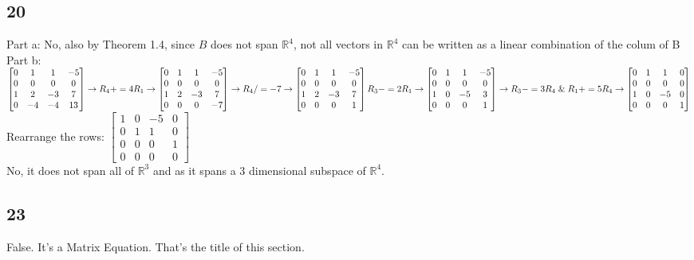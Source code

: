 \documentclass{article}
\begin{document}
\subsection*{20}
Part a: No, also by Theorem 1.4, since $B$ does not span $\mathbb{R}^4$, not all vectors in $\mathbb{R}^4$ can be written as a linear combination of the colum of B
\\[0.1in]Part b: $\begin{bmatrix}0 & 1 & 1 & -5 \\0 & 0 & 0 & 0 \\1 & 2 & -3 & 7 \\0 & -4 & -4 & 13\end{bmatrix}\rightarrow R_4 += 4R_1 \rightarrow 
\begin{bmatrix}0 & 1 & 1 & -5 \\0 & 0 & 0 & 0 \\1 & 2 & -3 & 7 \\0 & 0 & 0 & -7\end{bmatrix} \rightarrow R_4 /=-7 \rightarrow \begin{bmatrix}0 & 1 & 1 & -5 \\0 & 0 & 0 & 0 \\1 & 2 & -3 & 7 \\0 & 0 & 0 & 1\end{bmatrix} \\[0.1in]
R_3 -=2R_1 \rightarrow \begin{bmatrix}0 & 1 & 1 & -5 \\0 & 0 & 0 & 0 \\1 & 0 & -5 & 3 \\0 & 0 & 0 & 1\end{bmatrix} \rightarrow R_3 -= 3R_4 \; \& \; R_1+=5R_4 \rightarrow \begin{bmatrix}0 & 1 & 1 & 0 \\0 & 0 & 0 & 0 \\1 & 0 & -5 & 0 \\0 & 0 & 0 & 1\end{bmatrix}$
\\[0.1in] Rearrange the rows: $\begin{bmatrix}1 & 0 & -5 & 0 \\0 & 1 & 1 & 0 \\0 & 0 & 0 & 1\\0 & 0 & 0 & 0 \end{bmatrix}$ 
\\[0.1in] No, it does not span all of $\mathbb{R}^3$ and as it spans a 3 dimensional subspace of $\mathbb{R}^4$.
\subsection*{23}
False. It's a Matrix Equation. That's the title of this section.
\end{document}
